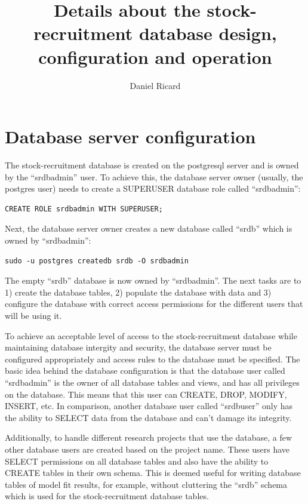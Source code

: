 \documentclass[letterpaper,12pt]{article}
\author{Daniel Ricard}
\title{Details about the stock-recruitment database design, configuration and operation}
\begin{document}
\maketitle

\section{Database server configuration}

The stock-recruitment database is created on the postgresql server and is owned by the ``srdbadmin'' user. To achieve this, the database server owner (usually, the postgres user) needs to create a SUPERUSER database role called ``srdbadmin'':
\begin{verbatim}
CREATE ROLE srdbadmin WITH SUPERUSER;
\end{verbatim}

Next, the database server owner creates a new database called ``srdb'' which is owned by ``srdbadmin'':
\begin{verbatim}
sudo -u postgres createdb srdb -O srdbadmin  
\end{verbatim}

The empty ``srdb'' database is now owned by ``srdbadmin''. The next tasks are to 1) create the database tables, 2) populate the database with data and 3) configure the database with correct access permissions for the different users that will be using it.

To achieve an acceptable level of access to the stock-recruitment database while maintaining database intergity and security, the database server must be configured appropriately and access rules to the database must be specified. The basic idea behind the database configuration is that the database user called ``srdbadmin'' is the owner of all database tables and views, and has all privileges on the database. This means that this user can CREATE, DROP, MODIFY, INSERT, etc. In comparison, another database user called ``srdbuser'' only has the ability to SELECT data from the database and can't damage its integrity.

Additionally, to handle different research projects that use the database, a few other database users are created based on the project name. These users have SELECT permissions on all database tables and also have the ability to CREATE tables in their own schema. This is deemed useful for writing database tables of model fit results, for example, without cluttering the ``srdb'' schema which is used for the stock-recruitment database tables.
\end{document}
